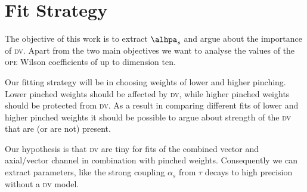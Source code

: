 \documentclass[../../index.tex]{subfiles}
\begin{document}
\section{Fit Strategy}
The objective of this work is to extract \(\alhpa_s\) and argue about the
importance of \textsc{dv}. Apart from the two main objectives we want to analyse
the values of the \textsc{ope} Wilson coefficients of up to dimension ten.

Our fitting strategy will be in choosing weights of lower and higher pinching.
Lower pinched weights should be affected by \textsc{dv}, while higher pinched
weights should be protected from \textsc{dv}. As a result in comparing different
fits of lower and higher pinched weights it should be possible to argue about
strength of the \textsc{dv} that are (or are not) present.

Our hypothesis is that \textsc{dv} are tiny for fits of the combined vector and
axial\-/vector channel in combination with pinched weights. Consequently we can
extract parameters, like the strong coupling \(\alpha_s\) from \(\tau\) decays
to high precision without a \textsc{dv} model.
\end{document}

